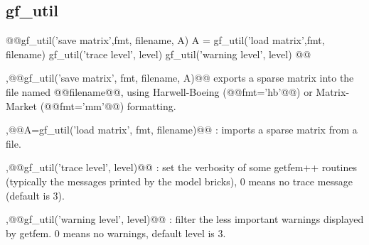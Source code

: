 \subsection{gf\_util}
\begin{synopsis}
@@gf_util('save matrix',\tstr fmt, \tstr filename, \tspmat A)
A = gf_util('load matrix',\tstr fmt, \tstr filename)
gf_util('trace level', \tint level)
gf_util('warning level', \tint level)
@@\end{synopsis}
\begin{cmddescription}
  \sep{@@gf_util('save matrix', fmt, filename, A)@@}  exports a sparse matrix into the file named @@filename@@, using
  Harwell-Boeing (@@fmt='hb'@@) or Matrix-Market (@@fmt='mm'@@) formatting.

  \sep{@@A=gf_util('load matrix', fmt, filename)@@} : imports a sparse matrix from a file.

  \sep{@@gf_util('trace level', level)@@} : set the verbosity of some
  getfem++ routines (typically the messages printed by the model
  bricks), 0 means no trace message (default is 3).

  \sep{@@gf_util('warning level', level)@@} : filter the less
  important warnings displayed by getfem. 0 means no warnings, default
  level is 3.
\end{cmddescription}


